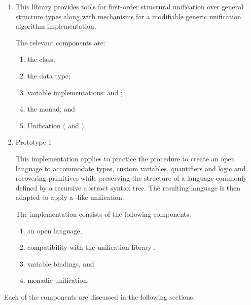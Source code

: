 \documentclass[thesis-solanki.tex]{subfiles}
\begin{document}
\begin{enumerate}
\item {} \cite{unification-fd-lib}

  This library provides tools for first-order structural unification over general structure types along with
  mechanisms for a modifiable generic unification algorithm implementation.

  The relevant components are:
\begin{enumerate}
\item the  class;

\item the  data type;

\item variable implementations:
   and ;

\item the  monad; and

\item Unification ( and ).
\end{enumerate}

\item Prototype 1

  This implementation applies to practice the procedure to create an open language to accommodate types,
  custom variables, quantifiers and logic and recovering primitives while preserving the structure of a
  language commonly defined by a recursive abstract syntax tree.
  The resulting language is then adapted to apply a -like unification.

The implementation consists of the following components:
\begin{enumerate}
\item an open language,

\item compatibility with the unification library \cite{unification-fd-lib},

\item variable bindings, and

\item monadic unification.

\end{enumerate}
\end{enumerate}

Each of the components are discussed in the following sections.
\end{document}
